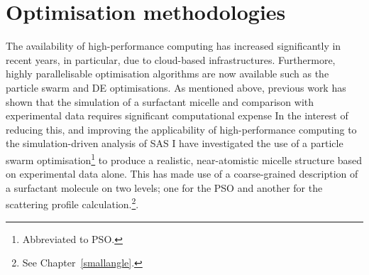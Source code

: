 \section{Optimisation methodologies}
The availability of high-performance computing has increased significantly in recent years, in particular, due to cloud-based infrastructures.
Furthermore, highly parallelisable optimisation algorithms are now available such as the particle swarm and DE optimisations.
As mentioned above, previous work has shown that the simulation of a surfactant micelle and comparison with experimental data requires significant computational expense
In the interest of reducing this, and improving the applicability of high-performance computing to the simulation-driven analysis of SAS I have investigated the use of a particle swarm optimisation\footnote{Abbreviated to PSO.} to produce a realistic, near-atomistic micelle structure based on experimental data alone.
This has made use of a coarse-grained description of a surfactant molecule on two levels; one for the PSO and another for the scattering profile calculation.\footnote{See Chapter~\ref{smallangle}.}.
